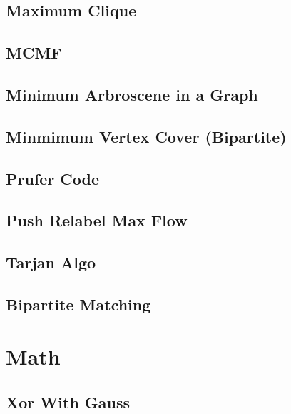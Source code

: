\subsection{Maximum Clique}
\raggedbottom
\hrulefill
\subsection{MCMF}
\raggedbottom
\hrulefill
\subsection{Minimum Arbroscene in a Graph}
\raggedbottom
\hrulefill
\subsection{Minmimum Vertex Cover (Bipartite)}
\raggedbottom
\hrulefill
\subsection{Prufer Code}
\raggedbottom
\hrulefill
\subsection{Push Relabel Max Flow}
\raggedbottom
\hrulefill
\subsection{Tarjan Algo}
\raggedbottom
\hrulefill
\subsection{Bipartite Matching}
\raggedbottom
\hrulefill

\section{Math}
\subsection{Xor With Gauss}
\raggedbottom
\hrulefill
